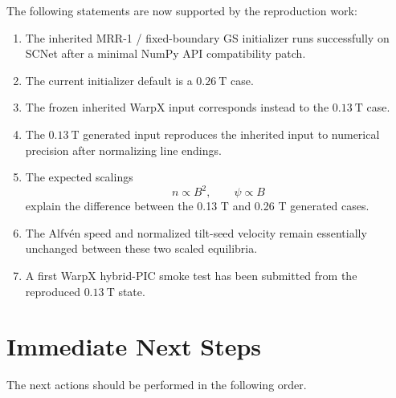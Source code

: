\documentclass[11pt,a4paper]{article}
\begin{document}
The following statements are now supported by the reproduction work:

\begin{enumerate}
    \item The inherited MRR-1 / fixed-boundary GS initializer runs successfully
    on SCNet after a minimal NumPy API compatibility patch.

    \item The current initializer default is a \(0.26~\mathrm{T}\) case.

    \item The frozen inherited WarpX input corresponds instead to the
    \(0.13~\mathrm{T}\) case.

    \item The \(0.13~\mathrm{T}\) generated input reproduces the inherited input
    to numerical precision after normalizing line endings.

    \item The expected scalings
    \[
    n\propto B^2,
    \qquad
    \psi\propto B
    \]
    explain the difference between the 0.13 T and 0.26 T generated cases.

    \item The Alfv\'en speed and normalized tilt-seed velocity remain
    essentially unchanged between these two scaled equilibria.

    \item A first WarpX hybrid-PIC smoke test has been submitted from the
    reproduced \(0.13~\mathrm{T}\) state.
\end{enumerate}

\section{Immediate Next Steps}

The next actions should be performed in the following order.
\end{document}
